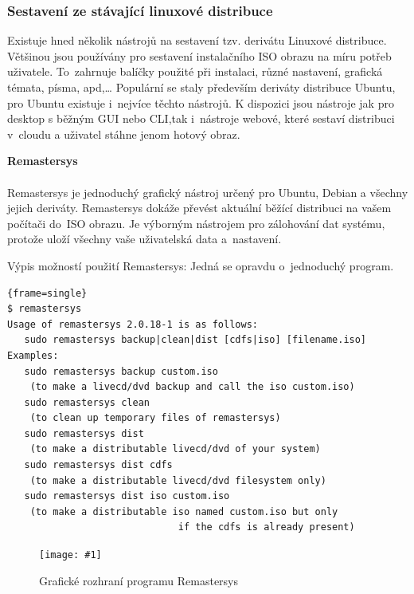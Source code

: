 \documentclass[a4paper,12pt]{article}
\newcommand{\nadpis}[1]{%
	\vspace{4 mm}
	\textbf{#1}\\
	\vspace{4 mm}
	}
\newcommand{\obr}[3]{%
	\begin{figure}[h]
	\center\texttt{[image: \#1]}
	\caption{#3}
	\end{figure}
	}
\newenvironment{codeframe}{%
  \begin{Sbox} 
    \begin{minipage} 
      {\columnwidth-\leftmargin-\rightmargin-2\fboxsep-2\fboxrule-4pt} 
}{%

  \end{minipage} 
  \end{Sbox} 
  \begin{center} 
    \fcolorbox{black}{codeback}{\TheSbox} 
  \end{center} 
}
\begin{document}
\subsubsection{Sestavení ze stávající linuxové distribuce} \label{sec:tvorbaDistribuce}
Existuje hned několik nástrojů na sestavení tzv. derivátu Linuxové distribuce. Většinou jsou používány pro sestavení instalačního ISO obrazu na míru potřeb uživatele. To~zahrnuje balíčky použité při instalaci, různé nastavení, grafická témata, písma, apd,… Populární se staly především deriváty distribuce Ubuntu, pro Ubuntu existuje i~nejvíce těchto nástrojů. K dispozici jsou nástroje jak pro desktop s běžným GUI nebo CLI,tak i~nástroje webové, které sestaví distribuci v~cloudu a uživatel stáhne jenom hotový obraz.

\nadpis{Remastersys}\\
Remastersys je jednoduchý grafický nástroj určený pro Ubuntu, Debian a všechny jejich deriváty. Remastersys dokáže převést aktuální běžící distribuci na vašem počítači do~ISO obrazu. Je výborným nástrojem pro zálohování dat systému, protože uloží všechny vaše uživatelská data a~nastavení.\cite{Linux_Build}

Výpis možností použití Remastersys: Jedná se opravdu o~jednoduchý program.
    \begin{codeframe} 
\begin{Verbatim}{frame=single} 
$ remastersys
Usage of remastersys 2.0.18-1 is as follows:
   sudo remastersys backup|clean|dist [cdfs|iso] [filename.iso]
Examples:
   sudo remastersys backup custom.iso
    (to make a livecd/dvd backup and call the iso custom.iso)
   sudo remastersys clean
    (to clean up temporary files of remastersys)
   sudo remastersys dist
    (to make a distributable livecd/dvd of your system)
   sudo remastersys dist cdfs
    (to make a distributable livecd/dvd filesystem only)
   sudo remastersys dist iso custom.iso
    (to make a distributable iso named custom.iso but only
                              if the cdfs is already present)
\end{Verbatim} 
    \end{codeframe} 
\begin{center}
\obr{./img/screens/remastersys.png}{0.5}{Grafické rozhraní programu Remastersys}

\end{center}

\end{document}
